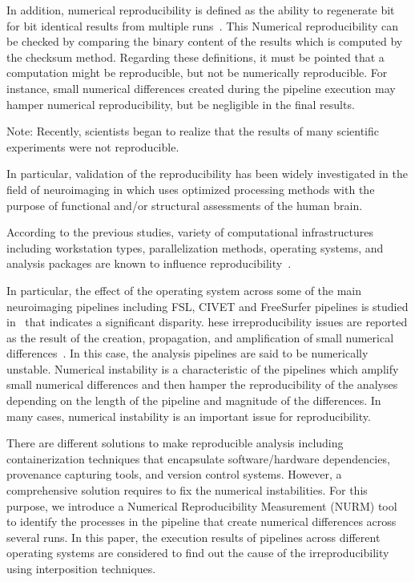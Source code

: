 \documentclass[a4paper,num-refs]{oup-contemporary}
\newcommand{\note}[2]{\color{blue}Note: #1\color{black}}
\begin{document}
In addition, numerical reproducibility is defined as the ability to 
regenerate bit for bit identical results from multiple 
runs~\cite{hill2017numerical}. This Numerical reproducibility can be 
checked by comparing the binary content of the results which is 
computed by the checksum method.
Regarding these definitions, it must be pointed that a
computation might be reproducible, but not 
be numerically reproducible. For instance, small numerical differences 
created during the pipeline execution may hamper numerical 
reproducibility, but be negligible in the final results.

\note{Recently, scientists began to realize that the results of many 
scientific experiments were not reproducible. 

In particular, validation of the reproducibility has been widely investigated 
in the field of neuroimaging in which uses optimized 
processing methods with the purpose of functional and/or structural 
assessments of the human brain.

According to the previous 
studies, variety of computational infrastructures including workstation 
types, parallelization methods, operating systems, and analysis 
packages are known to influence reproducibility~\cite{Gronenschild2012, 
diethelm2012limits, Glatard2015, bowring2019exploring}.

In particular, the effect of 
the operating system across some of the main 
neuroimaging pipelines including FSL, CIVET and FreeSurfer pipelines 
is studied in~\cite{Glatard2015, Gronenschild2012} that indicates a significant disparity. 
}

These irreproducibility issues are reported as the result of the 
creation, propagation, and amplification of small numerical 
differences~\cite{Gronenschild2012, diethelm2012limits, Glatard2015, 
bowring2019exploring}. In this case, the analysis pipelines are said to 
be numerically unstable. Numerical instability is a characteristic of 
the pipelines which amplify small numerical differences and then hamper 
the reproducibility of the analyses depending on the length of the 
pipeline and magnitude of the differences. In many cases, numerical 
instability is an important issue for reproducibility.

There are different solutions to make reproducible analysis including 
containerization techniques that encapsulate software/hardware 
dependencies, provenance capturing tools, and version control systems. 
However, a comprehensive solution requires to fix the numerical 
instabilities. For this purpose, we introduce a Numerical 
Reproducibility Measurement (NURM) tool to identify the processes in 
the pipeline that create numerical differences across several runs. In this 
paper, the execution results of pipelines across different operating 
systems are considered to find out the cause of the irreproducibility 
using interposition techniques.
\end{document}
